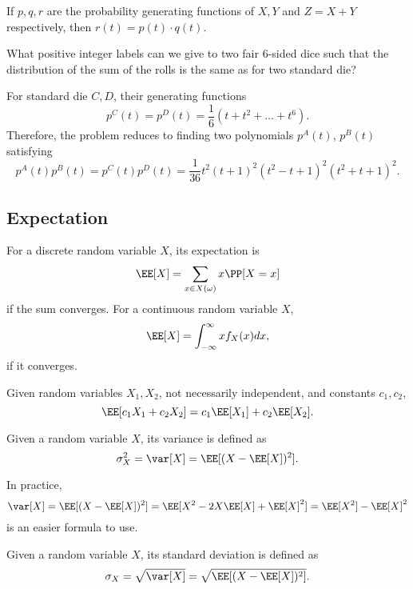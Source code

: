 \begin{theorem}
\lemlabel

If $p,q,r$ are the probability generating functions of $X, Y$ and $Z=X+Y$ respectively, then $r(t) = p(t)\cdot q(t)$. 
\end{theorem}

\begin{example}
\exlabel

What positive integer labels can we give to two fair $6$-sided dice such that the distribution of the sum of the rolls is the same as for two standard die?
\end{example}

For standard die $C,D$, their generating functions 
\[p^C(t) = p^D(t) = \frac{1}{6}(t+t^2+\hdots +t^6).\]
Therefore, the problem reduces to finding two polynomials $p^A(t)$, $p^B(t)$ satisfying
\[p^A(t)p^B(t) = p^C(t)p^D(t) = \frac{1}{36}t^2(t+1)^2(t^2-t+1)^2(t^2+t+1)^2.\]

\subsection{Expectation}

\begin{definition}

For a discrete random variable $X$, its \ac{expectation} is 
\[\EE[X] = \sum_{x\in X(\omega)} x\PP[X = x]\]
if the sum converges. For a continuous random variable $X$, 
\[\EE[X] = \int_{-\infty}^{\infty}xf_X(x)dx,\]
if it converges.
\end{definition}

\begin{theorem}

Given random variables $X_1, X_2$, not necessarily independent, and constants $c_1,c_2$, 
\[\EE[c_1X_1 + c_2X_2] = c_1\EE[X_1] + c_2\EE[X_2].\]
\end{theorem}

\begin{definition}

Given a random variable $X$, its \ac{variance} is defined as 
\[\sigma^2_X = \var[X] = \EE[(X-\EE[X])^2].\]
\end{definition}

In practice, 
\[\var[X] = \EE[(X - \EE[X])^2] = \EE[X^2 - 2X\EE[X] + \EE[X]^2] = \EE[X^2] - \EE[X]^2\]
is an easier formula to use.

\begin{definition}

Given a random variable $X$, its \ac{standard deviation} is defined as 
\[\sigma_X = \sqrt{\var[X]} = \sqrt{\EE[(X-\EE[X])^2]}.\]
\end{definition}

